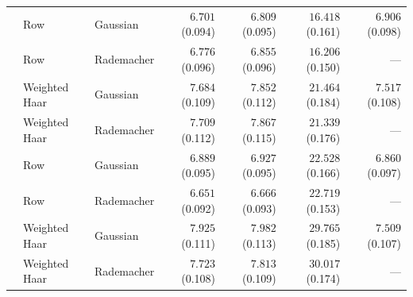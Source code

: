 \begin{tabular}{@{}rllrrrr@{}}
\addlinespace[3pt]
256 & Row & Gaussian & $6.701$ (0.094) & $6.809$ (0.095) & $16.418$ (0.161) & $6.906$ (0.098) \\
 & Row & Rademacher & $6.776$ (0.096) & $6.855$ (0.096) & $16.206$ (0.150) & --- \\
 & Weighted Haar & Gaussian & $7.684$ (0.109) & $7.852$ (0.112) & $21.464$ (0.184) & $7.517$ (0.108) \\
 & Weighted Haar & Rademacher & $7.709$ (0.112) & $7.867$ (0.115) & $21.339$ (0.176) & --- \\
\addlinespace[3pt]
512 & Row & Gaussian & $6.889$ (0.095) & $6.927$ (0.095) & $22.528$ (0.166) & $6.860$ (0.097) \\
 & Row & Rademacher & $6.651$ (0.092) & $6.666$ (0.093) & $22.719$ (0.153) & --- \\
 & Weighted Haar & Gaussian & $7.925$ (0.111) & $7.982$ (0.113) & $29.765$ (0.185) & $7.509$ (0.107) \\
 & Weighted Haar & Rademacher & $7.723$ (0.108) & $7.813$ (0.109) & $30.017$ (0.174) & --- \\
\bottomrule
\end{tabular}
